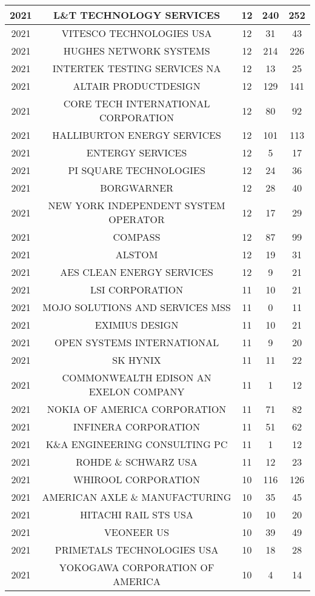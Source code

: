 \documentclass{article}%
\begin{document}
\begin{longtable}{c|c|c|c|c}
\hline%
2021&L\&T TECHNOLOGY SERVICES&12&240&252\\%
\hline%
2021&VITESCO TECHNOLOGIES USA&12&31&43\\%
\hline%
2021&HUGHES NETWORK SYSTEMS&12&214&226\\%
\hline%
2021&INTERTEK TESTING SERVICES NA&12&13&25\\%
\hline%
2021&ALTAIR PRODUCTDESIGN&12&129&141\\%
\hline%
2021&CORE TECH INTERNATIONAL CORPORATION&12&80&92\\%
\hline%
2021&HALLIBURTON ENERGY SERVICES&12&101&113\\%
\hline%
2021&ENTERGY SERVICES&12&5&17\\%
\hline%
2021&PI SQUARE TECHNOLOGIES&12&24&36\\%
\hline%
2021&BORGWARNER&12&28&40\\%
\hline%
2021&NEW YORK INDEPENDENT SYSTEM OPERATOR&12&17&29\\%
\hline%
2021&COMPASS&12&87&99\\%
\hline%
2021&ALSTOM&12&19&31\\%
\hline%
2021&AES CLEAN ENERGY SERVICES&12&9&21\\%
\hline%
2021&LSI CORPORATION&11&10&21\\%
\hline%
2021&MOJO SOLUTIONS AND SERVICES MSS&11&0&11\\%
\hline%
2021&EXIMIUS DESIGN&11&10&21\\%
\hline%
2021&OPEN SYSTEMS INTERNATIONAL&11&9&20\\%
\hline%
2021&SK HYNIX&11&11&22\\%
\hline%
2021&COMMONWEALTH EDISON AN EXELON COMPANY&11&1&12\\%
\hline%
2021&NOKIA OF AMERICA CORPORATION&11&71&82\\%
\hline%
2021&INFINERA CORPORATION&11&51&62\\%
\hline%
2021&K\&A ENGINEERING CONSULTING PC&11&1&12\\%
\hline%
2021&ROHDE \& SCHWARZ USA&11&12&23\\%
\hline%
2021&WHIROOL CORPORATION&10&116&126\\%
\hline%
2021&AMERICAN AXLE \& MANUFACTURING&10&35&45\\%
\hline%
2021&HITACHI RAIL STS USA&10&10&20\\%
\hline%
2021&VEONEER US&10&39&49\\%
\hline%
2021&PRIMETALS TECHNOLOGIES USA&10&18&28\\%
\hline%
2021&YOKOGAWA CORPORATION OF AMERICA&10&4&14\\%

\end{longtable}
\end{document}
